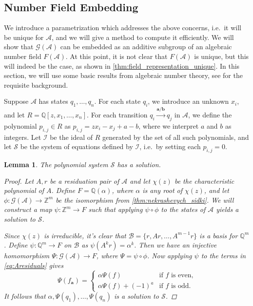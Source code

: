 \documentclass[12pt, letterpaper]{article}
\newcommand{\Z}{\mathbb Z}
\newcommand{\Q}{\mathbb Q}
\newcommand{\A}{\mathcal A}
\newcommand{\ch}[1]{\mathbf{#1}}
\newcommand{\res}[2]{{{#1}_{\ch{#2}}}}
\newcommand{\I}{\mathcal I}
\renewcommand{\S}{\mathcal S}
\newcommand{\gp}{\mathcal G}
\newtheorem{lemma}[thm]{Lemma}
\begin{document}
\subsection{Number Field Embedding}\label{sec:field-rep}
We introduce a parametrization which addresses the above concerns, i.e.\ it
will be unique for $\A$, and we will give a method to compute it efficiently.
We will show that $\gp(\A)$ can be embedded as an additive subgroup of an
algebraic number field $F(\A)$. At this point, it is not clear that $F(\A)$ is
unique, but this will indeed be the case, as shown in
\cref{thm:field_representation_unique}.  In this section, we will use some
basic results from algebraic number theory, see \cite{ireland1990classical,
stein2012algebraic} for the requisite background.

Suppose $\A$ has states $q_1, \ldots, q_n$. For each state $q_i$, we introduce
an unknown $x_i$, and let $R = \Q[z, x_1, \ldots, x_n]$. For each transition
$q_i \xrightarrow{\ch{a}/\ch{b}} q_j$ in $\A$, we define the polynomial
$p_{i,j} \in R$ as $p_{i,j} = z x_i - x_j + a - b$, where we interpret $a$
and $b$ as integers. Let $\I$ be the ideal of $R$ generated by the set of all
such polynomials, and let $\S$ be the system of equations defined by $\I$,
i.e.\ by setting each $p_{i,j} = 0$.

\begin{lemma}\label{lemma:solution_exists}
    The polynomial system $\S$ has a solution.
    \begin{proof}
        Let $A, r$ be a residuation pair of $\A$ and let $\chi(z)$ be the
        characteristic polynomial of $A$. Define $F = \Q(\alpha)$, where
        $\alpha$ is any root of $\chi(z)$, and let $\phi : \gp(\A) \rightarrow
        \Z^m$ be the isomorphism from \cref{thm:nekrashevych_sidki}. We will
        construct a map $\psi: \Z^m \rightarrow F$ such that applying $\psi
        \circ \phi$ to the states of $\A$ yields a solution to $\S$.

        Since $\chi(z)$ is irreducible, it's clear that $\mathcal B = \{r, Ar,
        \ldots, A^{m-1}r\}$ is a basis for $\Q^m$.  Define $\psi : \Q^m
        \rightarrow F$ on $\mathcal B$ as $\psi(A^k r) = \alpha^k$.  Then we
        have an injective homomorphism $\Psi: \gp(\A) \rightarrow F$, where
        $\Psi = \psi \circ \phi$.  Now applying $\psi$ to the terms in
        \cref{eq:Aresiduals} gives
        \begin{equation}
            \label{eq:aresiduals} \Psi(\res{f}{a}) = \begin{cases}
                \alpha \Psi(f) & \text{if $f$ is even,}\\
                \alpha \Psi(f) + (-1)^a & \text{if $f$ is odd.}
            \end{cases}
        \end{equation}
        It follows that $\alpha, \Psi(q_1), \ldots, \Psi(q_n)$ is a solution to
        $\S$.
    \end{proof}
\end{lemma}
\end{document}
